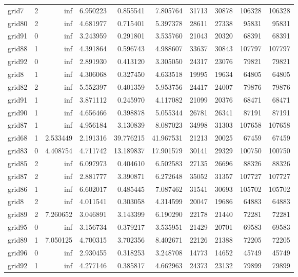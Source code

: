 \begin{longtable}{|l|r|r|r|r|r|r|r|r|r|}
grid7 & 2 & inf & 6.950223 & 0.855541 & 7.805764 & 31713 & 30878 & 106328 & 106328 \\
grid80 & 2 & inf & 4.681977 & 0.715401 & 5.397378 & 28611 & 27338 & 95831 & 95831 \\
grid91 & 0 & inf & 3.243959 & 0.291801 & 3.535760 & 21043 & 20320 & 68391 & 68391 \\
grid88 & 1 & inf & 4.391864 & 0.596743 & 4.988607 & 33637 & 30843 & 107797 & 107797 \\
grid92 & 0 & inf & 2.891930 & 0.413120 & 3.305050 & 24317 & 23076 & 79821 & 79821 \\
grid8 & 1 & inf & 4.306068 & 0.327450 & 4.633518 & 19995 & 19634 & 64805 & 64805 \\
grid82 & 2 & inf & 5.552397 & 0.401359 & 5.953756 & 24417 & 24007 & 79876 & 79876 \\
grid91 & 1 & inf & 3.871112 & 0.245970 & 4.117082 & 21099 & 20376 & 68471 & 68471 \\
grid90 & 1 & inf & 4.656466 & 0.398878 & 5.055344 & 26781 & 26341 & 87191 & 87191 \\
grid87 & 1 & inf & 4.956184 & 3.130839 & 8.087023 & 34998 & 31303 & 107658 & 107658 \\
grid68 & 1 & 2.533449 & 2.191316 & 39.776215 & 41.967531 & 21213 & 20025 & 67459 & 67459 \\
grid83 & 0 & 4.408754 & 4.711742 & 13.189837 & 17.901579 & 30141 & 29329 & 100750 & 100750 \\
grid85 & 2 & inf & 6.097973 & 0.404610 & 6.502583 & 27135 & 26696 & 88326 & 88326 \\
grid87 & 2 & inf & 2.881777 & 3.390871 & 6.272648 & 35052 & 31357 & 107727 & 107727 \\
grid86 & 1 & inf & 6.602017 & 0.485445 & 7.087462 & 31541 & 30693 & 105702 & 105702 \\
grid8 & 2 & inf & 4.011541 & 0.303058 & 4.314599 & 20047 & 19686 & 64883 & 64883 \\
grid89 & 2 & 7.260652 & 3.046891 & 3.143399 & 6.190290 & 22178 & 21440 & 72281 & 72281 \\
grid95 & 0 & inf & 3.156734 & 0.379217 & 3.535951 & 21429 & 20701 & 69583 & 69583 \\
grid89 & 1 & 7.050125 & 4.700315 & 3.702356 & 8.402671 & 22126 & 21388 & 72205 & 72205 \\
grid96 & 0 & inf & 2.930455 & 0.318253 & 3.248708 & 14773 & 14652 & 45749 & 45749 \\
grid92 & 1 & inf & 4.277146 & 0.385817 & 4.662963 & 24373 & 23132 & 79899 & 79899 \\

\end{longtable}
